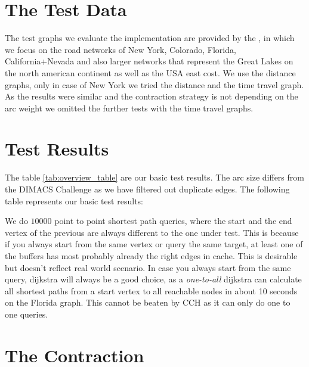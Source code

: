 \section{The Test Data}

The test graphs we evaluate the implementation are provided by the \cite[9th DIMACS Implementation Challenge - Shortest Paths]{DIMACS}, in which we focus on the road networks of New York, Colorado, Florida, California+Nevada and also larger networks that represent the Great Lakes on the north american continent as well as the USA east cost.
We use the distance graphs, only in case of New York we tried the distance and the time travel graph.
As the results were similar and the contraction strategy is not depending on the arc weight we omitted the further tests with the time travel graphs.

\section{Test Results}

The table \ref{tab:overview_table} are our basic test results.
The arc size differs from the DIMACS Challenge as we have filtered out duplicate edges.
The following table represents our basic test results:



We do $10000$ point to point shortest path queries, where the start and the end vertex of the previous are always different to the one under test.
This is because if you always start from the same vertex or query the same target, at least one of the buffers has most probably already the right edges in cache.
This is desirable but doesn't reflect real world scenario.
In case you always start from the same query, dijkstra will always be a good choice, as a \textit{one-to-all} dijkstra can calculate all shortest paths from a start vertex to all reachable nodes in about 10 seconds on the Florida graph.
This cannot be beaten by CCH as it can only do one to one queries.

\section{The Contraction}

